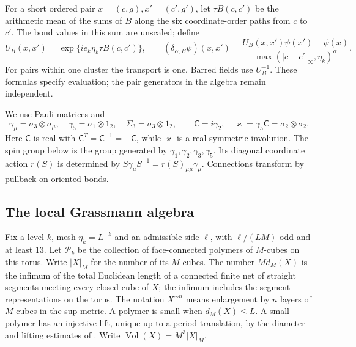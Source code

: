 For a short ordered pair \(x=(c,g),x'=(c',g')\), let
\(\tau B(c,c')\) be the arithmetic mean of the sums of \(B\)
along the six coordinate-order paths from \(c\) to \(c'\).
The bond values in this sum are unscaled; define
\[
 U_B(x,x')=\exp\{ie_k\eta_k\tau B(c,c')\},\qquad
 (\delta_{\alpha,B}\psi)(x,x')
       =\frac{U_B(x,x')\psi(x')-\psi(x)}
                    {\max(|c-c'|_\infty,\eta_k)^\alpha}.
\]
For pairs within one cluster the transport is one. Barred fields
use \(U_B^{-1}\). These formulas specify evaluation; the pair
generators in the algebra remain independent.

We use Pauli matrices and
\[
 \gamma_\mu=\sigma_3\otimes\sigma_\mu,\quad
 \gamma_5=\sigma_1\otimes1_2,\quad \Sigma_3=\sigma_3\otimes1_2,
 \qquad
 \mathsf C=i\gamma_2,\quad
 \varkappa=\gamma_5\mathsf C=\sigma_2\otimes\sigma_2 .
\]
Here \(\mathsf C\) is real with
\(\mathsf C^T=\mathsf C^{-1}=-\mathsf C\), while
\(\varkappa\) is a real symmetric involution. The spin group below
is the group generated by \(\gamma_1,\gamma_2,\gamma_3,\gamma_5\).
Its diagonal coordinate action \(r(S)\) is determined by
\(S\gamma_\mu S^{-1}=r(S)_{\mu\mu}\gamma_\mu\).
Connections transform by pullback on oriented bonds.

\subsection{The local Grassmann algebra}
\label{subsec:rg-activity-spaces}

Fix a level $k$, mesh $\eta_k=L^{-k}$ and an admissible side
$\ell$, with $\ell/(LM)$ odd and at least $13$.
Let $\mathcal P_k$ be the collection of face-connected polymers
of $M$-cubes on this torus. Write $|X|_M$ for the number of its $M$-cubes. The number $Md_M(X)$
is the infimum of the total Euclidean length of a connected finite
net of straight segments meeting every closed cube of $X$; the
infimum includes the segment representations on the torus.
The notation $X^{\sim n}$ means enlargement by $n$ layers of
$M$-cubes in the sup metric.
A polymer is small when
$d_M(X)\le L$. A small polymer has an injective lift, unique up
to a period translation, by the diameter and lifting estimates
of \cite[Appendix~B]{NormalizedContraction}.
Write $\operatorname{Vol}(X)=M^3|X|_M$.

